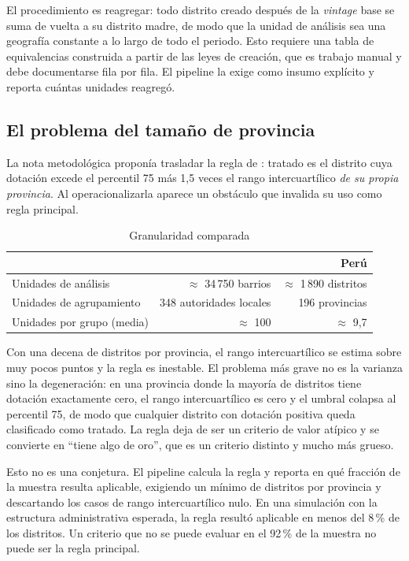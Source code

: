\documentclass[11pt,a4paper]{article}
\begin{document}
El procedimiento es reagregar: todo distrito creado después de la \emph{vintage} base se suma de vuelta a su distrito madre, de modo que la unidad de análisis sea una geografía constante a lo largo de todo el periodo. Esto requiere una tabla de equivalencias construida a partir de las leyes de creación, que es trabajo manual y debe documentarse fila por fila. El pipeline la exige como insumo explícito y reporta cuántas unidades reagregó.

\subsection{El problema del tamaño de provincia}\label{sec:tamano}

La nota metodológica proponía trasladar la regla de \citet{braakmann2024}: tratado es el distrito cuya dotación excede el percentil 75 más 1{,}5 veces el rango intercuartílico \emph{de su propia provincia}. Al operacionalizarla aparece un obstáculo que invalida su uso como regla principal.

\begin{table}[h!]
\centering
\singlespacing
\caption{Granularidad comparada}
\label{tab:granularidad}
\small
\begin{tabular}{L{6.4cm} r r}
\toprule
& \textbf{\citet{braakmann2024}} & \textbf{Perú} \\
\midrule
Unidades de análisis & $\approx$ 34\,750 barrios & $\approx$ 1\,890 distritos \\
Unidades de agrupamiento & 348 autoridades locales & 196 provincias \\
Unidades por grupo (media) & $\approx$ 100 & $\approx$ 9{,}7 \\
\bottomrule
\end{tabular}
\end{table}

Con una decena de distritos por provincia, el rango intercuartílico se estima sobre muy pocos puntos y la regla es inestable. El problema más grave no es la varianza sino la degeneración: en una provincia donde la mayoría de distritos tiene dotación exactamente cero, el rango intercuartílico es cero y el umbral colapsa al percentil 75, de modo que cualquier distrito con dotación positiva queda clasificado como tratado. La regla deja de ser un criterio de valor atípico y se convierte en ``tiene algo de oro'', que es un criterio distinto y mucho más grueso.

Esto no es una conjetura. El pipeline calcula la regla y reporta en qué fracción de la muestra resulta aplicable, exigiendo un mínimo de distritos por provincia y descartando los casos de rango intercuartílico nulo. En una simulación con la estructura administrativa esperada, la regla resultó aplicable en menos del 8\,\% de los distritos. Un criterio que no se puede evaluar en el 92\,\% de la muestra no puede ser la regla principal.
\end{document}
